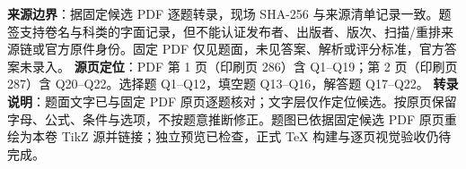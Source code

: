 

\begin{gktip}
\textbf{来源边界}：据固定候选 PDF 逐题转录，现场 SHA-256 与来源清单记录一致。题签支持卷名与科类的字面记录，但不能认证发布者、出版者、版次、扫描/重排来源链或官方原件身份。固定 PDF 仅见题面，未见答案、解析或评分标准，官方答案未录入。
\textbf{源页定位}：PDF 第 1 页（印刷页 286）含 Q1–Q19；第 2 页（印刷页 287）含 Q20–Q22。选择题 Q1–Q12，填空题 Q13–Q16，解答题 Q17–Q22。
\textbf{转录说明}：题面文字已与固定 PDF 原页逐题核对；文字层仅作定位候选。按原页保留字母、公式、条件与选项，不按题意推断修正。题图已依据固定候选 PDF 原页重绘为本卷 TikZ 源并链接；独立预览已检查，正式 TeX 构建与逐页视觉验收仍待完成。
\end{gktip}


